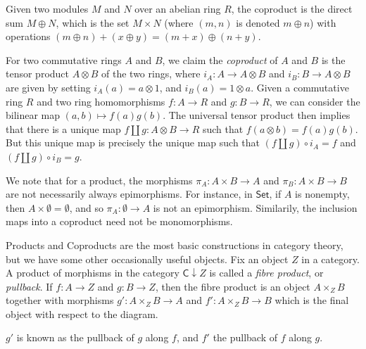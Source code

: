 \begin{example}
    Given two modules $M$ and $N$ over an abelian ring $R$, the coproduct is the direct sum $M \oplus N$, which is the set $M \times N$ (where $(m,n)$ is denoted $m \oplus n$) with operations $(m \oplus n) + (x \oplus y) = (m + x) \oplus (n + y)$.
\end{example}

\begin{example}
    For two commutative rings $A$ and $B$, we claim the \emph{coproduct} of $A$ and $B$ is the tensor product $A \otimes B$ of the two rings, where $i_A: A \to A \otimes B$ and $i_B: B \to A \otimes B$ are given by setting $i_A(a) = a \otimes 1$, and $i_B(a) = 1 \otimes a$. Given a commutative ring $R$ and two ring homomorphisms $f: A \to R$ and $g: B \to R$, we can consider the bilinear map $(a,b) \mapsto f(a)g(b)$. The universal tensor product then implies that there is a unique map $f \amalg g: A \otimes B \to R$ such that $f(a \otimes b) = f(a)g(b)$. But this unique map is precisely the unique map such that $(f \amalg g) \circ i_A = f$ and $(f \amalg g) \circ i_B = g$.
\end{example}

We note that for a product, the morphisms $\pi_A: A \times B \to A$ and $\pi_B : A \times B \to B$ are not necessarily always epimorphisms. For instance, in $\mathsf{Set}$, if $A$ is nonempty, then $A \times \emptyset = \emptyset$, and so $\pi_A: \emptyset \to A$ is not an epimorphism. Similarily, the inclusion maps into a coproduct need not be monomorphisms.

Products and Coproducts are the most basic constructions in category theory, but we have some other occasionally useful objects. Fix an object $Z$ in a category. A product of morphisms in the category $\mathsf{C} \downarrow Z$ is called a \emph{fibre product}, or \emph{pullback}. If $f: A \to Z$ and $g: B \to Z$, then the fibre product is an object $A \times_Z B$ together with morphisms $g': A \times_Z B \to A$ and $f': A \times_Z B \to B$ which is the final object  with respect to the diagram.
%
\begin{center}
\end{center}
%
$g'$ is known as the pullback of $g$ along $f$, and $f'$ the pullback of $f$ along $g$.

